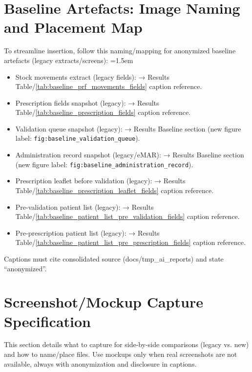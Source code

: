 \section{Baseline Artefacts: Image Naming and Placement Map}
To streamline insertion, follow this naming/mapping for anonymized baseline artefacts (legacy extracts/screens):
\begingroup\emergencystretch=1.5em
\begin{itemize}
    \item Stock movements extract (legacy fields): \texttt{} → Results Table/\ref{tab:baseline_prf_movements_fields} caption reference.
    \item Prescription fields snapshot (legacy): \texttt{} → Results Table/\ref{tab:baseline_prescription_fields} caption reference.
    \item Validation queue snapshot (legacy): \texttt{} → Results Baseline section (new figure label: \texttt{fig:baseline\_validation\_queue}).
    \item Administration record snapshot (legacy/eMAR): \texttt{} → Results Baseline section (new figure label: \texttt{fig:baseline\_administration\_record}).
    \item Prescription leaflet before validation (legacy): \texttt{} → Results Table/\ref{tab:baseline_prescription_leaflet_fields} caption reference.
    \item Pre-validation patient list (legacy): \texttt{} → Results Table/\ref{tab:baseline_patient_list_pre_validation_fields} caption reference.
    \item Pre-prescription patient list (legacy): \texttt{} → Results Table/\ref{tab:baseline_patient_list_pre_prescription_fields} caption reference.
\end{itemize}
\endgroup

Captions must cite consolidated source (docs/tmp\_ai\_reports) and state “anonymized”.

\section{Screenshot/Mockup Capture Specification}
This section details what to capture for side-by-side comparisons (legacy vs. new) and how to name/place files. Use mockups only when real screenshots are not available, always with anonymization and disclosure in captions.
